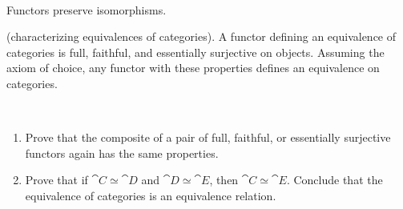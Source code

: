 \documentclass[main.tex]{subfiles}
\begin{document}
\paragraph{}
\begin{lemma}
	Functors preserve isomorphisms.
\end{lemma}
\begin{theorem} \textnormal{(characterizing equivalences of categories).}
	A functor defining an equivalence of categories is full, faithful, and
	essentially surjective on objects. Assuming the axiom of choice, any functor
	with these properties defines an equivalence on categories.
\end{theorem}
\begin{exercise}\ \\
	\begin{enumerate}[i]
		\item Prove that the composite of a pair of full, faithful, or
			essentially surjective functors again has the same properties.

		\item Prove that if $\cat{C}\simeq\cat{D}$ and $\cat{D}\simeq\cat{E}$,
			then $\cat{C}\simeq\cat{E}$. Conclude that the equivalence of
			categories is an equivalence relation.
	\end{enumerate}
\end{exercise}
\end{document}
